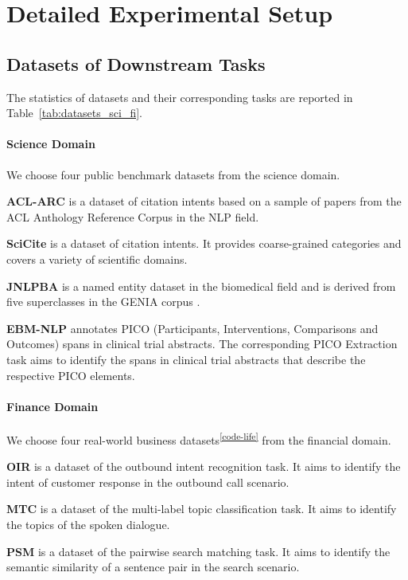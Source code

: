 \documentclass[11pt]{article}
\begin{document}
\section{Detailed Experimental Setup} \label{sec:appendix_exper_setups}
\subsection{Datasets of Downstream Tasks}
\label{sec:appendix_dataset}
The statistics of datasets and their corresponding tasks are reported in Table~\ref{tab:datasets_sci_fi}.
\paragraph{Science Domain}
We choose four public benchmark datasets from the science domain.

\textbf{ACL-ARC} \cite{DBLP:journals/tacl/JurgensKHMJ18}
is a dataset of citation intents based on a
sample of papers from the ACL Anthology Reference Corpus \cite{DBLP:conf/lrec/BirdDDGJKLPRT08} in the NLP field. 

\textbf{SciCite} \cite{DBLP:conf/naacl/CohanAZC19} is a dataset of citation intents. 
It provides coarse-grained categories and covers a variety of scientific domains.

\textbf{JNLPBA} \cite{DBLP:conf/bionlp/CollierK04}
is a named entity dataset in the biomedical field and is derived from five superclasses in the GENIA corpus \cite{kim2003genia}.

\textbf{EBM-NLP} \cite{DBLP:conf/acl/NenkovaLYMWNP18} annotates PICO (Participants, Interventions, Comparisons and Outcomes) spans in clinical trial abstracts. The corresponding PICO Extraction task aims to identify the spans in clinical trial abstracts that describe the respective PICO elements.

\paragraph{Finance Domain}
We choose four real-world business datasets\textsuperscript{\ref{code-life}} from the 
financial domain.


\textbf{OIR} is a dataset of the outbound intent recognition task. It aims to identify the intent of customer response in the outbound call scenario. 

\textbf{MTC} is a dataset of the multi-label topic classification task. It aims to identify the topics of the spoken dialogue. 

\textbf{PSM} is a dataset of the pairwise search matching task. It aims to identify the semantic similarity of a sentence pair in the search scenario.
\end{document}

